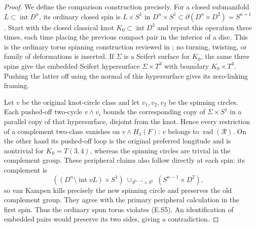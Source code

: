 \begin{proof}
We define the comparison construction precisely. For a closed
submanifold $L\subset\operatorname{int}D^n$, its ordinary closed
spin is $L\times S^1$ in
$D^n\times S^1\subset\partial(D^n\times D^2)=S^{n+1}$.
Start with the closed classical knot $K_0\subset\operatorname{int}D^3$
and repeat this operation three times, each time placing the
previous compact pair in the interior of a disc. This is the
ordinary torus spinning construction reviewed in
\cite[Section 3, immediately before Theorem 3.4]{mapsWinter08};
no turning, twisting, or family of deformations is inserted.
If $\Sigma$ is a Seifert surface for $K_0$, the same three spins
give the embedded Seifert hypersurface
$\Sigma\times T^3$ with boundary $K_0\times T^3$.
Pushing the latter off using the normal of this hypersurface
gives its zero-linking framing.

Let $v$ be the original knot-circle class and let $v_1,v_2,v_3$
be the spinning circles. Each pushed-off two-cycle $v\wedge v_i$
bounds the corresponding copy of $\Sigma\times S^1$ in a parallel
copy of that hypersurface, disjoint from the knot. Hence every
restriction of a complement two-class vanishes on $v\wedge H_1(F)$:
$v$ belongs to $\operatorname{rad}(\mathcal R)$.
On the other hand its pushed-off loop is the original preferred
longitude and is nontrivial for $K_0=T(3,4)$, whereas the spinning
circles are trivial in the complement group. These peripheral
claims also follow directly at each spin: its complement is
\[
 ((D^n\setminus\operatorname{int}\nu L)\times S^1)
       \ \cup_{S^{n-1}\times S^1}\ (S^{n-1}\times D^2),
\]
so van Kampen kills precisely the new spinning circle and preserves
the old complement group. They agree with the primary peripheral
calculation \cite[Theorem 4.5]{mapsWinter08} in the first spin.
Thus the ordinary spun torus violates (E.S5). An identification
of embedded pairs would preserve its two sides, giving a
contradiction.


\end{proof}
